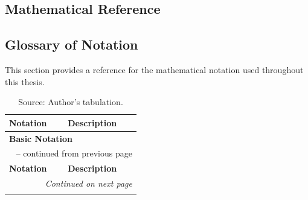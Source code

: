 \begin{appendices}

  \chapter{Mathematical Reference} %
  \label{app:math_reference} %

  \section{Glossary of Notation}
  \label{app:math_notation} %

  This section provides a reference for the mathematical notation used throughout this thesis. 

  \begingroup %
  \begin{longtable}{p{}p{}}
    \caption[Summary of Mathematical Notation]{Mathematical Notation} \label{tab:math_notation}                                        \\ %
    \toprule
    \textbf{Notation}                           & \textbf{Description}                                                                 \\
    \midrule
    \multicolumn{2}{l}{\textbf{Basic Notation}}                                                                                        \\
    \midrule
    \endfirsthead
    \multicolumn{2}{c}{\tablename\ \thetable{} -- continued from previous page}                                                        \\
    \toprule
    \textbf{Notation}                           & \textbf{Description}                                                                 \\
    \midrule
    \endhead
    \midrule
    \multicolumn{2}{r}{\textit{Continued on next page}}                                                                                \\
    \endfoot
    \bottomrule
    \caption*{Source: Author's tabulation.}
    \endlastfoot


\end{longtable}
\end{appendices}
